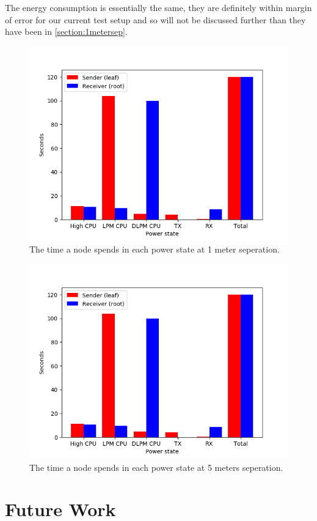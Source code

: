 \documentclass[conference]{IEEEtran}
\begin{document}
The energy consumption is essentially the same, they are definitely within margin of error for our current test setup and so will not be discussed further than they have been in \ref{section:1metersep}. 


\begin{figure}[]
	\centering
	\includegraphics[width=.5\textwidth,keepaspectratio]{1m_powerStates.png}
	\caption{The time a node spends in each power state at 1 meter seperation.}
	\label{fig:powerState1m}
\end{figure}
\begin{figure}[]
	\centering
	\includegraphics[width=.5\textwidth,keepaspectratio]{5m_powerStates.png}
	\caption{The time a node spends in each power state at 5 meters seperation.}
	\label{fig:powerState5m}
\end{figure}





\section{Future Work}
\end{document}
